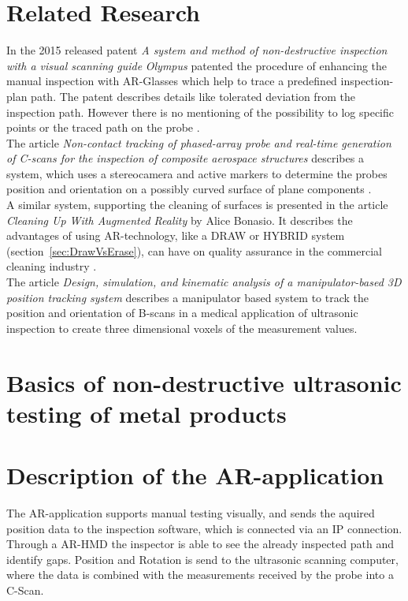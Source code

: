 \documentclass{VRARWorkshop}
\begin{document}
\section{Related Research}
In the 2015 released patent \textit{A system and method of non-destructive inspection with a visual scanning guide} \textit{Olympus} patented the procedure of enhancing the manual inspection with AR-Glasses which help to trace a predefined inspection-plan path.
The patent describes details like tolerated deviation from the inspection path.
However there is no mentioning of the possibility to log specific points or the traced path on the probe \cite{ARPat15}.\\

The article \textit{Non-contact tracking of phased-array probe and real-time generation of C-scans for the inspection of composite aerospace structures} describes a system, which uses a stereocamera and active markers to determine the probes position and orientation on a possibly curved surface of plane components \cite{walter_non-contact_2007}.\\

A similar system, supporting the cleaning of surfaces is presented in the article \textit{Cleaning Up With Augmented Reality} by Alice Bonasio.
It describes the advantages of using AR-technology, like a DRAW or HYBRID system (section~\ref{sec:DrawVsErase}), can have on quality assurance in the commercial cleaning industry \cite{ARClean}.\\

The article \textit{Design, simulation, and kinematic analysis of a manipulator-based 3D position tracking system} describes a manipulator based system to track the position and orientation of B-scans in a medical application of ultrasonic inspection to create three dimensional voxels of the measurement values.
\cite{fadzil_design_2015}\\

\section{Basics of non-destructive ultrasonic testing of metal products}
\cite{deutsch_zfp_2010}
\cite{moles_introduction_2004}
\cite{olympus_Grundlagen}

\section{Description of the AR-application}
The AR-application supports manual testing visually, and sends the aquired position data to the inspection software, which is connected via an IP connection.
Through a AR-HMD the inspector is able to see the already inspected path and identify gaps.
Position and Rotation is send to the ultrasonic scanning computer, where the data is combined with the measurements received by the probe into a C-Scan.
\end{document}
